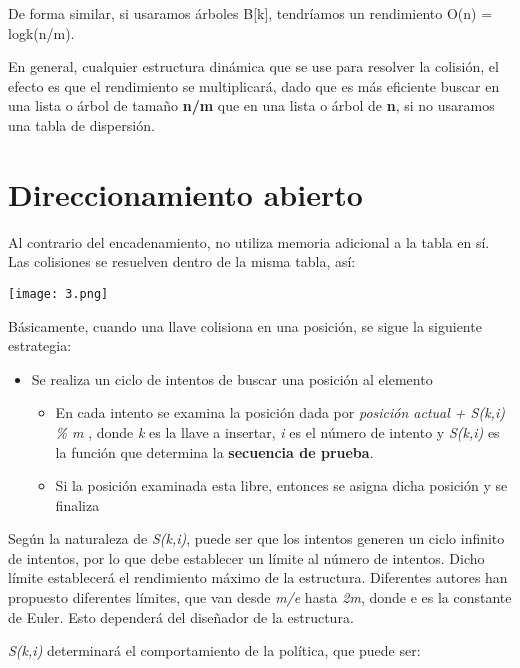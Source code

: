 De forma similar, si usaramos árboles B[k], tendríamos un rendimiento
O(n) = logk(n/m).

En general, cualquier estructura dinámica que se use para resolver la
colisión, el efecto es que el rendimiento se multiplicará, dado que es
más eficiente buscar en una lista o árbol de tamaño \textbf{n/m} que
en una lista o árbol de \textbf{n}, si no usaramos una tabla de
dispersión.

\section{Direccionamiento abierto}
\label{sec:direcc-abierto}

Al contrario del encadenamiento, no utiliza memoria adicional a la
tabla en sí.  Las colisiones se resuelven dentro de la misma tabla,
así:

\begin{center}
  \texttt{[image: 3.png]}
\end{center}

Básicamente, cuando una llave colisiona en una posición, se sigue la
siguiente estrategia:
\begin{itemize}
\item Se realiza un ciclo de intentos de buscar una posición al elemento
  \begin{itemize}
  \item En cada intento se examina la posición dada por
    \textit{posición actual + S(k,i) \% m} , donde \textit{k} es la
    llave a insertar, \textit{i} es el número de intento y
    \textit{S(k,i)} es la función que determina la \textbf{secuencia
      de prueba}.
  \item Si la posición examinada esta libre, entonces se asigna dicha
    posición y se finaliza
  \end{itemize}
\end{itemize}
    
Según la naturaleza de \textit{S(k,i)}, puede ser que los intentos
generen un ciclo infinito de intentos, por lo que debe establecer un
límite al número de intentos. Dicho límite establecerá el rendimiento
máximo de la estructura.  Diferentes autores han propuesto diferentes
límites, que van desde \textit{m/e} hasta \textit{2m}, donde e es la
constante de Euler.  Esto dependerá del diseñador de la estructura.

\textit{S(k,i)} determinará el comportamiento de la política, que
puede ser:
        
